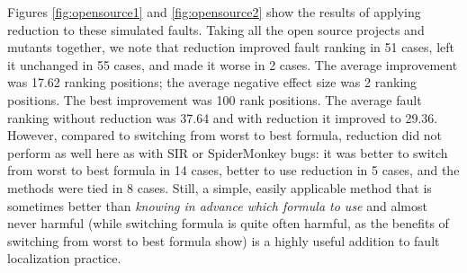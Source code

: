 Figures \ref{fig:opensource1} and \ref{fig:opensource2} show the
results of applying reduction to these simulated faults.  Taking all
the open source projects and mutants together, we note that reduction
improved fault ranking in 51 cases, left it unchanged in 55 cases, and
made it worse in 2 cases.  The average improvement was 17.62 ranking
positions; the average negative effect size was 2 ranking positions.
The best improvement was 100
rank positions.  The average fault ranking without
reduction was 37.64 and with reduction it improved to 29.36.  However,
compared to switching from worst to best formula, reduction did not
perform as well here as with SIR or SpiderMonkey bugs: it was
 better to switch from worst to best formula in 14
cases, better to use reduction in 5 cases, and the methods were tied
in 8 cases.  Still, a simple, easily applicable method that is
sometimes better than \emph{knowing in advance which formula to use}
and almost never harmful (while switching formula is quite often
harmful, as the benefits of switching from worst to best formula show)
is a highly useful addition to fault localization practice.
